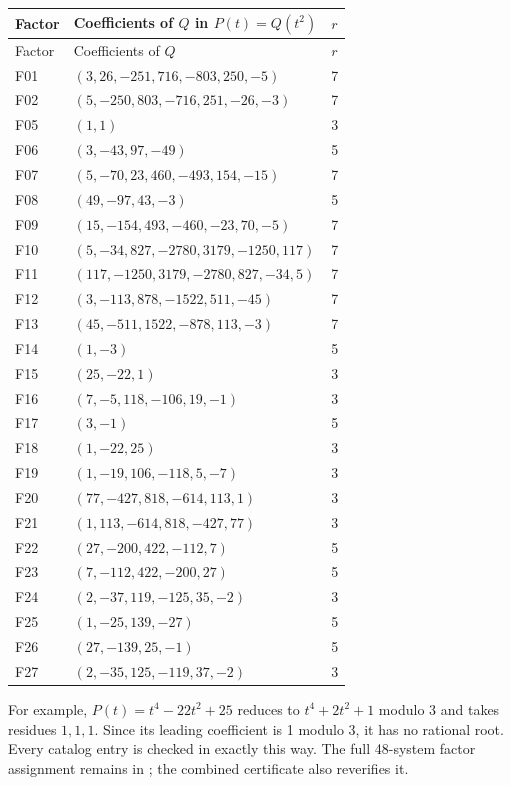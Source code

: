 \documentclass[11pt,letterpaper]{article}
\theoremstyle{definition}\newtheorem{definition}[theorem]{Definition}
\theoremstyle{remark}\newtheorem{remark}[theorem]{Remark}
\begin{document}
{\small
\begin{longtable}{lll}
\toprule
Factor & Coefficients of $Q$ in $P(t)=Q(t^2)$ & $r$\\
\midrule
\endfirsthead
\toprule Factor & Coefficients of $Q$ & $r$\\\midrule
\endhead
F01 & $(3,26,-251,716,-803,250,-5)$ & 7 \\
F02 & $(5,-250,803,-716,251,-26,-3)$ & 7 \\
F05 & $(1,1)$ & 3 \\
F06 & $(3,-43,97,-49)$ & 5 \\
F07 & $(5,-70,23,460,-493,154,-15)$ & 7 \\
F08 & $(49,-97,43,-3)$ & 5 \\
F09 & $(15,-154,493,-460,-23,70,-5)$ & 7 \\
F10 & $(5,-34,827,-2780,3179,-1250,117)$ & 7 \\
F11 & $(117,-1250,3179,-2780,827,-34,5)$ & 7 \\
F12 & $(3,-113,878,-1522,511,-45)$ & 7 \\
F13 & $(45,-511,1522,-878,113,-3)$ & 7 \\
F14 & $(1,-3)$ & 5 \\
F15 & $(25,-22,1)$ & 3 \\
F16 & $(7,-5,118,-106,19,-1)$ & 3 \\
F17 & $(3,-1)$ & 5 \\
F18 & $(1,-22,25)$ & 3 \\
F19 & $(1,-19,106,-118,5,-7)$ & 3 \\
F20 & $(77,-427,818,-614,113,1)$ & 3 \\
F21 & $(1,113,-614,818,-427,77)$ & 3 \\
F22 & $(27,-200,422,-112,7)$ & 5 \\
F23 & $(7,-112,422,-200,27)$ & 5 \\
F24 & $(2,-37,119,-125,35,-2)$ & 3 \\
F25 & $(1,-25,139,-27)$ & 5 \\
F26 & $(27,-139,25,-1)$ & 5 \\
F27 & $(2,-35,125,-119,37,-2)$ & 3 \\
\bottomrule
\end{longtable}

For example, $P(t)=t^4-22t^2+25$ reduces to $t^4+2t^2+1$ modulo 3 and takes residues $1,1,1$. Since its leading coefficient is 1 modulo 3, it has no rational root. Every catalog entry is checked in exactly this way. The full 48-system factor assignment remains in ; the combined certificate also reverifies it.

}
\end{document}
